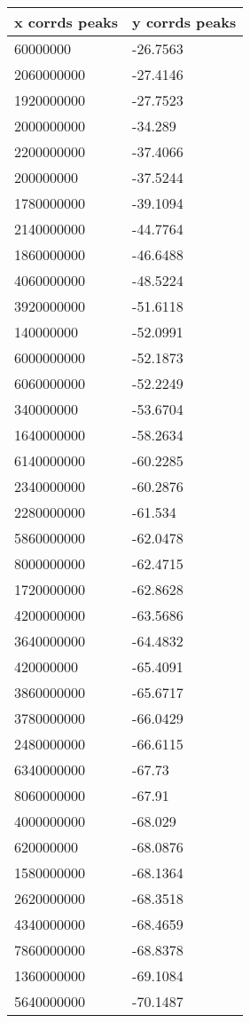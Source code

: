 \begin{tabular}{ll}
x corrds peaks & y corrds peaks \\ 
\hline 
60000000 & -26.7563 \\ 
2060000000 & -27.4146 \\ 
1920000000 & -27.7523 \\ 
2000000000 & -34.289 \\ 
2200000000 & -37.4066 \\ 
200000000 & -37.5244 \\ 
1780000000 & -39.1094 \\ 
2140000000 & -44.7764 \\ 
1860000000 & -46.6488 \\ 
4060000000 & -48.5224 \\ 
3920000000 & -51.6118 \\ 
140000000 & -52.0991 \\ 
6000000000 & -52.1873 \\ 
6060000000 & -52.2249 \\ 
340000000 & -53.6704 \\ 
1640000000 & -58.2634 \\ 
6140000000 & -60.2285 \\ 
2340000000 & -60.2876 \\ 
2280000000 & -61.534 \\ 
5860000000 & -62.0478 \\ 
8000000000 & -62.4715 \\ 
1720000000 & -62.8628 \\ 
4200000000 & -63.5686 \\ 
3640000000 & -64.4832 \\ 
420000000 & -65.4091 \\ 
3860000000 & -65.6717 \\ 
3780000000 & -66.0429 \\ 
2480000000 & -66.6115 \\ 
6340000000 & -67.73 \\ 
8060000000 & -67.91 \\ 
4000000000 & -68.029 \\ 
620000000 & -68.0876 \\ 
1580000000 & -68.1364 \\ 
2620000000 & -68.3518 \\ 
4340000000 & -68.4659 \\ 
7860000000 & -68.8378 \\ 
1360000000 & -69.1084 \\ 
5640000000 & -70.1487 \\ 

\end{tabular}
